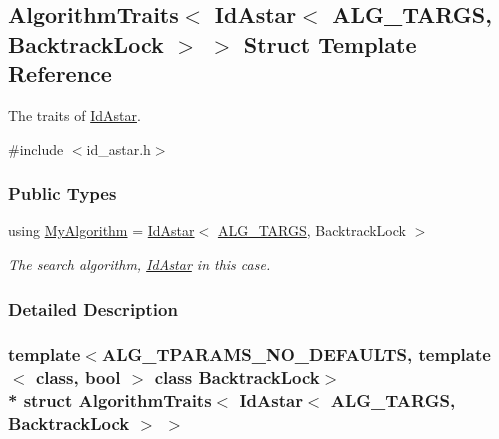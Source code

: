 \hypertarget{structAlgorithmTraits_3_01IdAstar_3_01ALG__TARGS_00_01BacktrackLock_01_4_01_4}{}\subsection{Algorithm\+Traits$<$ Id\+Astar$<$ A\+L\+G\+\_\+\+T\+A\+R\+GS, Backtrack\+Lock $>$ $>$ Struct Template Reference}
\label{structAlgorithmTraits_3_01IdAstar_3_01ALG__TARGS_00_01BacktrackLock_01_4_01_4}


The traits of \hyperlink{structIdAstar}{Id\+Astar}.  




{\ttfamily \#include $<$id\+\_\+astar.\+h$>$}

\subsubsection*{Public Types}
\begin{DoxyCompactItemize}
\item 
using \hyperlink{structAlgorithmTraits_3_01IdAstar_3_01ALG__TARGS_00_01BacktrackLock_01_4_01_4_a02bac321b1c09cb9a275b14d89280e99}{My\+Algorithm} = \hyperlink{structIdAstar}{Id\+Astar}$<$ \hyperlink{algorithm_8h_a425b5a86fe8dae889a8343e14267c3c0}{A\+L\+G\+\_\+\+T\+A\+R\+GS}, Backtrack\+Lock $>$\hypertarget{structAlgorithmTraits_3_01IdAstar_3_01ALG__TARGS_00_01BacktrackLock_01_4_01_4_a02bac321b1c09cb9a275b14d89280e99}{}\label{structAlgorithmTraits_3_01IdAstar_3_01ALG__TARGS_00_01BacktrackLock_01_4_01_4_a02bac321b1c09cb9a275b14d89280e99}

\begin{DoxyCompactList}\small\item\em The search algorithm, \hyperlink{structIdAstar}{Id\+Astar} in this case. \end{DoxyCompactList}\end{DoxyCompactItemize}


\subsubsection{Detailed Description}
\subsubsection*{template$<$A\+L\+G\+\_\+\+T\+P\+A\+R\+A\+M\+S\+\_\+\+N\+O\+\_\+\+D\+E\+F\+A\+U\+L\+TS, template$<$ class, bool $>$ class Backtrack\+Lock$>$\\*
struct Algorithm\+Traits$<$ Id\+Astar$<$ A\+L\+G\+\_\+\+T\+A\+R\+G\+S, Backtrack\+Lock $>$ $>$}

